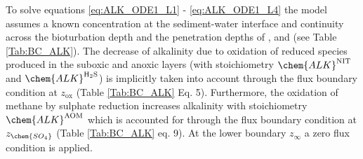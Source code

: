 \documentclass[gmd, manuscript]{copernicus}
\begin{document}
To solve equations \ref{eq:ALK_ODE1_L1} - \ref{eq:ALK_ODE1_L4} the model assumes a known concentration at the sediment-water interface and continuity 
across the bioturbation depth and the penetration depths of ,  and  (see Table \ref{Tab:BC_ALK}). 
The decrease of alkalinity due to oxidation of reduced species produced in the suboxic and anoxic layers (with stoichiometry 
$\chem{ALK}^\mathrm{NIT}$ and $\chem{ALK}^\mathrm{H_2S}$) is implicitly taken into account 
through the flux boundary condition at $z_{\mathrm{ox}}$ (Table \ref{Tab:BC_ALK} Eq. 5). 
Furthermore, the oxidation of methane by sulphate reduction increases alkalinity with stoichiometry $\chem{ALK}^\mathrm{AOM}$ which is accounted for through the flux boundary condition 
at $z_{\chem{SO_4}}$ (Table \ref{Tab:BC_ALK} eq. 9). At the lower boundary $z_\infty$ a zero flux condition is applied. 
\end{document}
